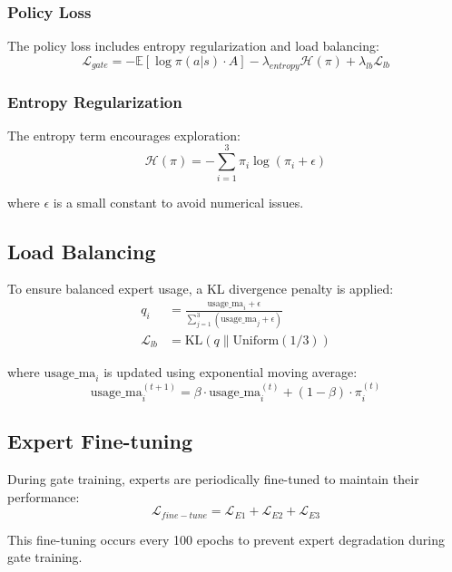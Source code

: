 \documentclass[11pt]{article}
\begin{document}
\subsubsection{Policy Loss}
The policy loss includes entropy regularization and load balancing:
\begin{equation}
    \mathcal{L}_{gate} = -\mathbb{E}[\log \pi(a|s) \cdot A] - \lambda_{entropy} \mathcal{H}(\pi) + \lambda_{lb} \mathcal{L}_{lb}
\end{equation}

\subsubsection{Entropy Regularization}
The entropy term encourages exploration:
\begin{equation}
    \mathcal{H}(\pi) = -\sum_{i=1}^3 \pi_i \log(\pi_i + \epsilon)
\end{equation}

where $\epsilon$ is a small constant to avoid numerical issues.

\subsection{Load Balancing}
To ensure balanced expert usage, a KL divergence penalty is applied:
\begin{align}
    q_i &= \frac{\text{usage\_ma}_i + \epsilon}{\sum_{j=1}^3 (\text{usage\_ma}_j + \epsilon)} \\
    \mathcal{L}_{lb} &= \text{KL}(q \| \text{Uniform}(1/3))
\end{align}

where $\text{usage\_ma}_i$ is updated using exponential moving average:
\begin{equation}
    \text{usage\_ma}_i^{(t+1)} = \beta \cdot \text{usage\_ma}_i^{(t)} + (1-\beta) \cdot \pi_i^{(t)}
\end{equation}

\subsection{Expert Fine-tuning}
During gate training, experts are periodically fine-tuned to maintain their performance:
\begin{equation}
    \mathcal{L}_{fine-tune} = \mathcal{L}_{E1} + \mathcal{L}_{E2} + \mathcal{L}_{E3}
\end{equation}

This fine-tuning occurs every 100 epochs to prevent expert degradation during gate training.
\end{document}
